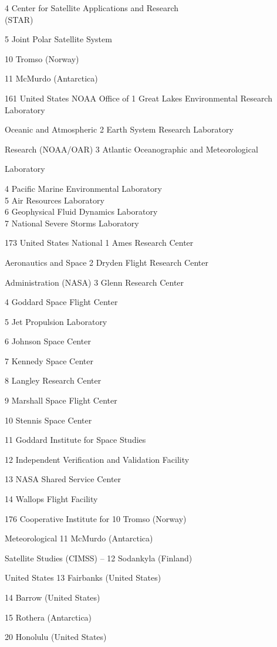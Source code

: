 4 Center for Satellite Applications and Research\\
(STAR)

5 Joint Polar Satellite System

10 Tromso (Norway)

11 McMurdo (Antarctica)

161 United States NOAA Office of 1 Great Lakes Environmental Research Laboratory

Oceanic and Atmospheric 2 Earth System Research Laboratory

Research (NOAA/OAR) 3 Atlantic Oceanographic and Meteorological

Laboratory

4 Pacific Marine Environmental Laboratory\\
5 Air Resources Laboratory\\
6 Geophysical Fluid Dynamics Laboratory\\
7 National Severe Storms Laboratory

173 United States National 1 Ames Research Center

Aeronautics and Space 2 Dryden Flight Research Center

Administration (NASA) 3 Glenn Research Center

4 Goddard Space Flight Center

5 Jet Propulsion Laboratory

6 Johnson Space Center

7 Kennedy Space Center

8 Langley Research Center

9 Marshall Space Flight Center

10 Stennis Space Center

11 Goddard Institute for Space Studies

12 Independent Verification and Validation Facility

13 NASA Shared Service Center

14 Wallops Flight Facility

176 Cooperative Institute for 10 Tromso (Norway)

Meteorological 11 McMurdo (Antarctica)

Satellite Studies (CIMSS) -- 12 Sodankyla (Finland)

United States 13 Fairbanks (United States)

14 Barrow (United States)

15 Rothera (Antarctica)

20 Honolulu (United States)

